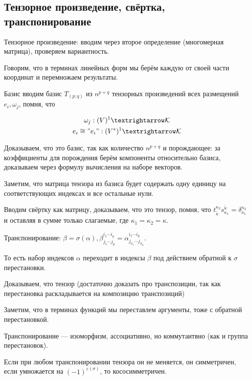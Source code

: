 \documentclass[12pt, a4paper]{article}
\begin{document}
\subsection{Тензорное произведение, свёртка, транспонирование}

Тензорное произведение: вводим через второе определение 
(многомерная матрица), проверяем вариантность.

Говорим, что в терминах линейных форм мы берём 
каждую от своей части координат и перемножаем результаты.

Базис вводим базис $T_{(p; q)}$ 
из $n^{p + q}$ тензорных произведений всех размещений $e_i, \omega_j$,
помня, что 

\begin{gather*}
    \omega_j : (V)^1 → \mathcal{K} \\
    e_i \cong "e_i" : (V^*)^1 → \mathcal{K}
\end{gather*}

Доказываем, что это базис, так как количество $n^{p + q}$ 
и порождающее: за коэффициенты для порождения берём 
компоненты относительно базиса, доказываем через формулу вычисления на наборе векторов.

Заметим, что матрица тензора из базиса будет содержать одну единицу 
на соответствующих индексах и все остальные нули.

Вводим свёртку как матрицу, доказываем, что это тензор, помня, что 
$t_{\tilde{\kappa}}^{\kappa_{2}} s_{\kappa_{1}}^{\tilde{\kappa}} = \delta_{\kappa_{1}}^{\kappa_{2}}$ 
и оставляя в сумме только слагаемые, где $\kappa_{1}=\kappa_{2}=\kappa$.

Транспонирование: $\beta = \sigma(\alpha), \beta_{j_{1} \cdots j_{p}}^{i_{1} \cdots i_{q}}=\alpha_{j_{\sigma_{1}} \cdots j_{\sigma_{p}}}^{i_{1} \cdots i_{q}}$.

То есть набор индексов $\alpha$ переходит в индексы $\beta$ 
под действием обратной к $\sigma$ перестановки.

Доказываем, что тензор 
(достаточно доказать про транспозиции, 
так как перестановка раскладывается на композицию транспозиций) 

Заметим, что в терминах функций мы переставлем аргументы, тоже с обратной перестановкой.

Транспонирование — изоморфизм, ассоциативно, но коммутаитвно (как и группа перестановок).

Если при любом транспонировании тензора он не меняется, он симметричен, 
если умножается на $(-1)^{\varepsilon(\sigma)}$, то кососимметричен.
\end{document}

